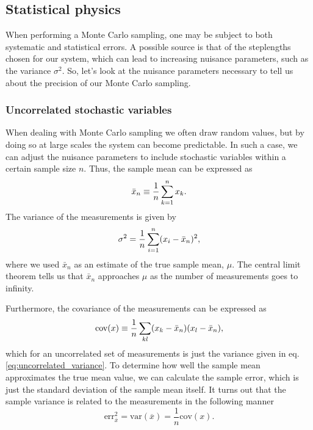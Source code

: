\documentclass[
    a4paper, aps, twocolumn, floatfix, superscriptaddress,
    nofootinbib]{revtex4-1}
\begin{document}
\subsection{Statistical physics}
When performing a Monte Carlo sampling, one may be subject to both systematic and statistical errors. A possible source is that of the steplengths chosen for our system, which can lead to increasing nuisance parameters, such as the variance $\sigma^2$. So, let's look at the nuisance parameters necessary to tell us about the precision of our Monte Carlo sampling.

\subsubsection{Uncorrelated stochastic variables}
When dealing with Monte Carlo sampling we often draw random values, but by doing so at large scales the system can become predictable. In such a case, we can adjust the nuisance parameters to include stochastic variables within a certain sample size $n$. Thus, the sample mean can be expressed as
\begin{equation}%
    \Bar{x}_n \equiv \frac{1}{n} \sum_{k=1}^n x_k. \label{eq:uncorrelated_mean}
\end{equation}
The variance of the measurements is given by
\begin{equation}%
    \sigma^2 = \frac{1}{n}\sum_{i=1}^n (x_i - \Bar{x}_n)^2, \label{eq:uncorrelated_variance}
\end{equation}
 where we used $\bar{x}_n$ as an estimate of the true sample mean, $\mu$. The central limit theorem tells us that $\bar{x}_n$ approaches $\mu$ as the number of measurements goes to infinity.

 
Furthermore, the covariance of the measurements can be expressed as
\begin{equation}\label{eq:32}
    \text{cov}(x) \equiv \frac{1}{n} \sum_{kl} (x_k-\Bar{x}_n)(x_l-\Bar{x}_n),
\end{equation}
which for an uncorrelated set of measurements is just the variance given in eq.\eqref{eq:uncorrelated_variance}. 
To determine how well the sample mean approximates the true mean value, we can calculate the sample error, which is just the standard deviation of the sample mean itself. It turns out that the sample variance is related to the measurements in the following manner \cite{Stat.Phys.}
\begin{equation}\label{eq:33}
    \text{err}_{\overline{x}}^2 = \text{var}(\overline{x})= \frac{1}{n}\text{cov}(x). 
\end{equation}
\end{document}
